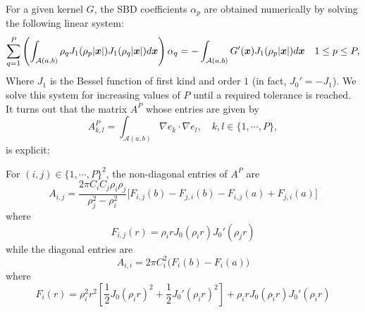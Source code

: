 \documentclass[11pt,a4paper]{article}
\begin{document}
For a given kernel $G$, the SBD coefficients $\alpha_p$ are obtained numerically by solving the following linear system: 
\begin{equation}
	\sum_{q = 1}^P \left(\int_{\mathcal{A}(a,b)} \rho_ q J_1(\rho_p|\boldsymbol{x}|) J_1(\rho_q|\boldsymbol{x}|) d\boldsymbol{x}\right) \alpha_q = -\int_{\mathcal{A}(a,b)} G'(\boldsymbol{x}) J_1(\rho_p|\boldsymbol{x}|)d\boldsymbol{x} \quad 1\leq p \leq P,
	\label{LinearSystem}
\end{equation}
Where $J_1$ is the Bessel function of first kind and order $1$ (in fact, $J_0' = - J_1$). We solve this system for increasing values of $P$ until a required tolerance is reached. It turns out that the matrix $A^P$ whose entries are given by
\[ A^P_{k,l} = \int_{\mathcal{A}(a,b)} \!\!\!\!\!\!\!\! \nabla e_k \cdot \nabla e_l,\quad k,l \in \{1,\cdots,P\},\]
is explicit:
\begin{Prop}
	For $(i,j) \in \{1,\cdots,P\}^2$, the non-diagonal entries of $A^P$ are
	\begin{equation*}
		A_{i,j} = \frac{2\pi C_i C_j \rho_i \rho_j}{\rho_j^2 - \rho_i^2}\bigg[F_{i,j}(b) - F_{j,i}(b) - F_{i,j}(a) + F_{j,i}(a)\bigg]
	\end{equation*}
	where 
	\[	 F_{i,j}(r) =  \rho_i r J_0(\rho_i r)J_0'(\rho_j r)\]
	while the diagonal entries are
	\begin{equation*}
		A_{i,i} = 2\pi C_i^2 \big(F_i(b) - F_i(a)\big)
	\end{equation*}
	where 
	\[F_i(r) = \rho_i^2r^2\left[\dfrac{1}{2}J_0(\rho_ir)^2 + \frac{1}{2}J_0'(\rho_ir)^2\right] + \rho_irJ_0(\rho_i r)J_0'(\rho_ir)\]
\end{Prop}
\end{document}
